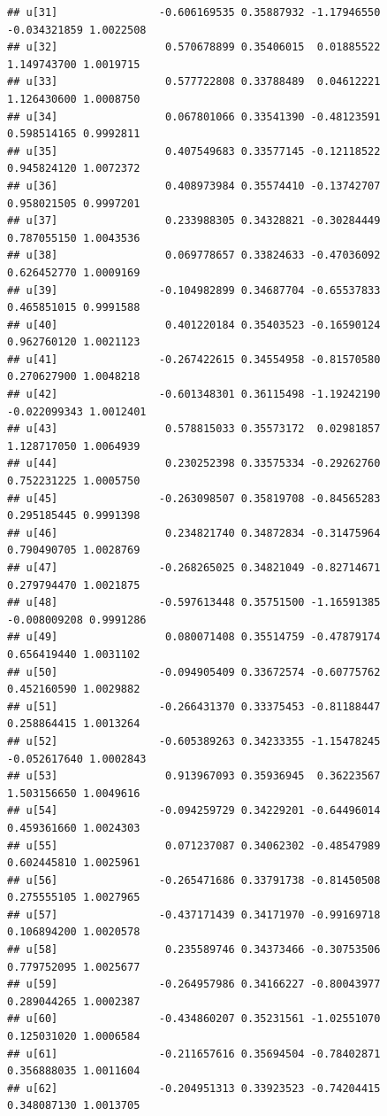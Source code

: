 \documentclass[
]{article}
\begin{document}
\begin{verbatim}
## u[31]                -0.606169535 0.35887932 -1.17946550 -0.034321859 1.0022508
## u[32]                 0.570678899 0.35406015  0.01885522  1.149743700 1.0019715
## u[33]                 0.577722808 0.33788489  0.04612221  1.126430600 1.0008750
## u[34]                 0.067801066 0.33541390 -0.48123591  0.598514165 0.9992811
## u[35]                 0.407549683 0.33577145 -0.12118522  0.945824120 1.0072372
## u[36]                 0.408973984 0.35574410 -0.13742707  0.958021505 0.9997201
## u[37]                 0.233988305 0.34328821 -0.30284449  0.787055150 1.0043536
## u[38]                 0.069778657 0.33824633 -0.47036092  0.626452770 1.0009169
## u[39]                -0.104982899 0.34687704 -0.65537833  0.465851015 0.9991588
## u[40]                 0.401220184 0.35403523 -0.16590124  0.962760120 1.0021123
## u[41]                -0.267422615 0.34554958 -0.81570580  0.270627900 1.0048218
## u[42]                -0.601348301 0.36115498 -1.19242190 -0.022099343 1.0012401
## u[43]                 0.578815033 0.35573172  0.02981857  1.128717050 1.0064939
## u[44]                 0.230252398 0.33575334 -0.29262760  0.752231225 1.0005750
## u[45]                -0.263098507 0.35819708 -0.84565283  0.295185445 0.9991398
## u[46]                 0.234821740 0.34872834 -0.31475964  0.790490705 1.0028769
## u[47]                -0.268265025 0.34821049 -0.82714671  0.279794470 1.0021875
## u[48]                -0.597613448 0.35751500 -1.16591385 -0.008009208 0.9991286
## u[49]                 0.080071408 0.35514759 -0.47879174  0.656419440 1.0031102
## u[50]                -0.094905409 0.33672574 -0.60775762  0.452160590 1.0029882
## u[51]                -0.266431370 0.33375453 -0.81188447  0.258864415 1.0013264
## u[52]                -0.605389263 0.34233355 -1.15478245 -0.052617640 1.0002843
## u[53]                 0.913967093 0.35936945  0.36223567  1.503156650 1.0049616
## u[54]                -0.094259729 0.34229201 -0.64496014  0.459361660 1.0024303
## u[55]                 0.071237087 0.34062302 -0.48547989  0.602445810 1.0025961
## u[56]                -0.265471686 0.33791738 -0.81450508  0.275555105 1.0027965
## u[57]                -0.437171439 0.34171970 -0.99169718  0.106894200 1.0020578
## u[58]                 0.235589746 0.34373466 -0.30753506  0.779752095 1.0025677
## u[59]                -0.264957986 0.34166227 -0.80043977  0.289044265 1.0002387
## u[60]                -0.434860207 0.35231561 -1.02551070  0.125031020 1.0006584
## u[61]                -0.211657616 0.35694504 -0.78402871  0.356888035 1.0011604
## u[62]                -0.204951313 0.33923523 -0.74204415  0.348087130 1.0013705

\end{verbatim}
\end{document}
